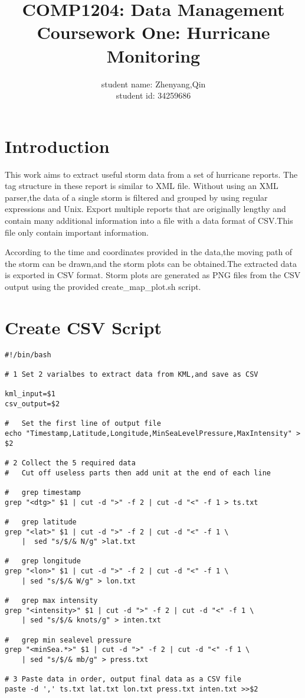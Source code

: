 \documentclass[]{article}
\title{COMP1204: Data Management \\ Coursework One: Hurricane Monitoring }
\author{student name: Zhenyang,Qin \\ student id: 34259686}
\begin{document}
\maketitle

\section{Introduction}
This work aims to extract useful storm data from a set of hurricane reports. The tag structure in these report is similar to XML file. Without using an XML parser,the data of a single storm is filtered and grouped by using regular expressions and Unix. Export multiple reports that are originally lengthy and contain many additional information into a file with a data format of CSV.This file only contain important information.

{\parskip=7pt
According to the time and coordinates provided in the data,the moving path of the storm can be drawn,and the storm plots can be obtained.The extracted data is exported in CSV format. Storm plots are generated as PNG files
from the CSV output using the provided create\_map\_plot.sh script.}

\section{Create CSV Script}

\begin{verbatim}
#!/bin/bash

# 1 Set 2 varialbes to extract data from KML,and save as CSV

kml_input=$1
csv_output=$2

#   Set the first line of output file
echo "Timestamp,Latitude,Longitude,MinSeaLevelPressure,MaxIntensity" > $2

# 2 Collect the 5 required data
# 	Cut off useless parts then add unit at the end of each line

#   grep timestamp
grep "<dtg>" $1 | cut -d ">" -f 2 | cut -d "<" -f 1 > ts.txt

#   grep latitude
grep "<lat>" $1 | cut -d ">" -f 2 | cut -d "<" -f 1 \
    |  sed "s/$/& N/g" >lat.txt

#   grep longitude
grep "<lon>" $1 | cut -d ">" -f 2 | cut -d "<" -f 1 \
    | sed "s/$/& W/g" > lon.txt

#   grep max intensity
grep "<intensity>" $1 | cut -d ">" -f 2 | cut -d "<" -f 1 \
    | sed "s/$/& knots/g" > inten.txt

#   grep min sealevel pressure
grep "<minSea.*>" $1 | cut -d ">" -f 2 | cut -d "<" -f 1 \
    | sed "s/$/& mb/g" > press.txt

# 3 Paste data in order, output final data as a CSV file
paste -d ',' ts.txt lat.txt lon.txt press.txt inten.txt >>$2
\end{verbatim}
\end{document}
